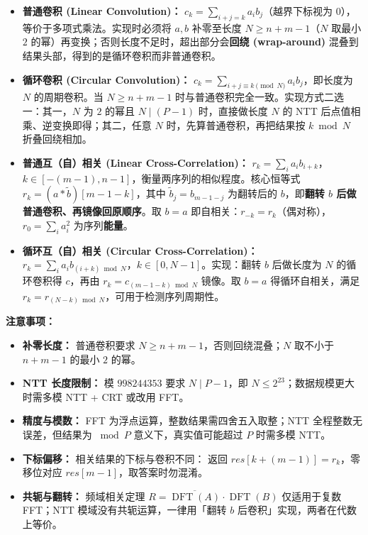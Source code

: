 \begin{itemize}
    \item \textbf{普通卷积 (Linear Convolution)：} $c_k=\sum_{i+j=k}a_ib_j$（越界下标视为 $0$），等价于多项式乘法。实现时必须将 $a,b$ 补零至长度 $N\ge n+m-1$（$N$ 取最小 $2$ 的幂）再变换；否则长度不足时，超出部分会\textbf{回绕 (wrap-around)} 混叠到结果头部，得到的是循环卷积而非普通卷积。
    \item \textbf{循环卷积 (Circular Convolution)：} $c_k=\sum_{i+j\equiv k\pmod N}a_ib_j$，即长度为 $N$ 的周期卷积。当 $N\ge n+m-1$ 时与普通卷积完全一致。实现方式二选一：其一，$N$ 为 $2$ 的幂且 $N\mid(P-1)$ 时，直接做长度 $N$ 的 NTT 后点值相乘、逆变换即得；其二，任意 $N$ 时，先算普通卷积，再把结果按 $k\bmod N$ 折叠回绕相加。
    \item \textbf{普通互（自）相关 (Linear Cross-Correlation)：} $r_k=\sum_i a_ib_{i+k}$，$k\in[-(m-1),n-1]$，衡量两序列的相似程度。核心恒等式 $r_k=(a\ast\tilde b)[m-1-k]$，其中 $\tilde b_j=b_{m-1-j}$ 为翻转后的 $b$，即\textbf{翻转 $b$ 后做普通卷积、再镜像回原顺序}。取 $b=a$ 即自相关：$r_{-k}=r_k$（偶对称），$r_0=\sum_i a_i^2$ 为序列\textbf{能量}。
    \item \textbf{循环互（自）相关 (Circular Cross-Correlation)：} $r_k=\sum_i a_ib_{(i+k)\bmod N}$，$k\in[0,N-1]$。实现：翻转 $b$ 后做长度为 $N$ 的循环卷积得 $c$，再由 $r_k=c_{(m-1-k)\bmod N}$ 镜像。取 $b=a$ 得循环自相关，满足 $r_k=r_{(N-k)\bmod N}$，可用于检测序列周期性。
\end{itemize}

\textbf{注意事项：}
\begin{itemize}
    \item \textbf{补零长度：} 普通卷积要求 $N\ge n+m-1$，否则回绕混叠；$N$ 取不小于 $n+m-1$ 的最小 $2$ 的幂。
    \item \textbf{NTT 长度限制：} 模 $998244353$ 要求 $N\mid P-1$，即 $N\le 2^{23}$；数据规模更大时需多模 NTT + CRT 或改用 FFT。
    \item \textbf{精度与模数：} FFT 为浮点运算，整数结果需四舍五入取整；NTT 全程整数无误差，但结果为 $\bmod P$ 意义下，真实值可能超过 $P$ 时需多模 NTT。
    \item \textbf{下标偏移：} 相关结果的下标与卷积不同： 返回 $res[k+(m-1)]=r_k$，零移位对应 $res[m-1]$，取答案时勿混淆。
    \item \textbf{共轭与翻转：} 频域相关定理 $R=\overline{\operatorname{DFT}(A)}\cdot\operatorname{DFT}(B)$ 仅适用于复数 FFT；NTT 模域没有共轭运算，一律用「翻转 $b$ 后卷积」实现，两者在代数上等价。
\end{itemize}

